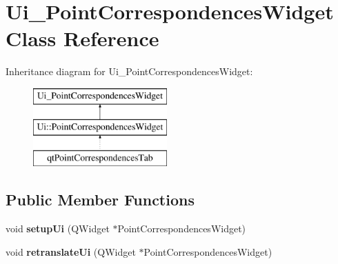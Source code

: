 \hypertarget{class_ui___point_correspondences_widget}{}\section{Ui\+\_\+\+Point\+Correspondences\+Widget Class Reference}
\label{class_ui___point_correspondences_widget}
Inheritance diagram for Ui\+\_\+\+Point\+Correspondences\+Widget\+:\begin{figure}[H]
\begin{center}
\leavevmode
\includegraphics[height=3.000000cm]{class_ui___point_correspondences_widget}
\end{center}
\end{figure}
\subsection*{Public Member Functions}
\begin{DoxyCompactItemize}
\item 
\hypertarget{class_ui___point_correspondences_widget_a618c81231de2cde74d1d3d179f8d6ce9}{}void {\bfseries setup\+Ui} (Q\+Widget $\ast$Point\+Correspondences\+Widget)\label{class_ui___point_correspondences_widget_a618c81231de2cde74d1d3d179f8d6ce9}

\item 
\hypertarget{class_ui___point_correspondences_widget_a519e195a9f31a898fb0dcf8e9f5f37b6}{}void {\bfseries retranslate\+Ui} (Q\+Widget $\ast$Point\+Correspondences\+Widget)\label{class_ui___point_correspondences_widget_a519e195a9f31a898fb0dcf8e9f5f37b6}

\end{DoxyCompactItemize}
